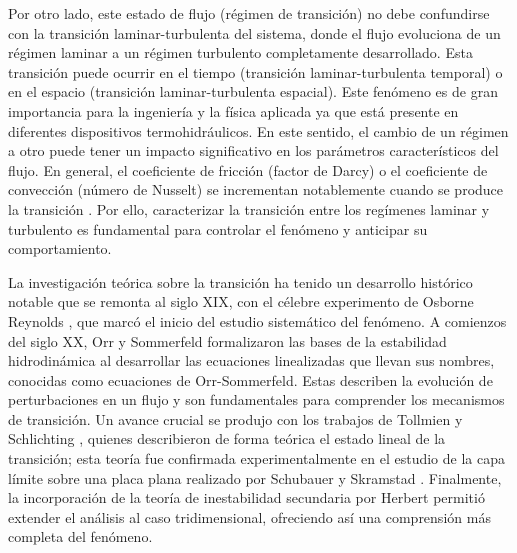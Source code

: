 Por otro lado, este estado de flujo (régimen de transición) no debe confundirse con la transición laminar-turbulenta del sistema, donde el flujo evoluciona de un régimen laminar a un régimen turbulento completamente desarrollado. Esta transición puede ocurrir en el tiempo (transición laminar-turbulenta temporal) o en el espacio (transición laminar-turbulenta espacial). Este fenómeno es de gran importancia para la ingeniería y la física aplicada ya que está presente en diferentes dispositivos termohidráulicos. En este sentido, el cambio de un régimen a otro puede tener un impacto significativo en los parámetros característicos del flujo. En general, el coeficiente de fricción (factor de Darcy) o el coeficiente de convección (número de Nusselt) se incrementan notablemente cuando se produce la transición \cite{incropera,white}. Por ello, caracterizar la transición entre los regímenes laminar y turbulento es fundamental para controlar el fenómeno y anticipar su comportamiento. 

La investigación teórica sobre la transición ha tenido un desarrollo histórico notable que se remonta al siglo XIX, con el célebre experimento de Osborne Reynolds \cite{reynolds1883}, que marcó el inicio del estudio sistemático del fenómeno. A comienzos del siglo XX, Orr \cite{orr1907} y Sommerfeld \cite{sommerfeld1908} formalizaron las bases de la estabilidad hidrodinámica al desarrollar las ecuaciones linealizadas que llevan sus nombres, conocidas como ecuaciones de Orr-Sommerfeld. Estas describen la evolución de perturbaciones en un flujo y son fundamentales para comprender los mecanismos de transición. Un avance crucial se produjo con los trabajos de Tollmien \cite{tollmien1930} y Schlichting \cite{schlichting1933}, quienes describieron de forma teórica el estado lineal de la transición; esta teoría fue confirmada experimentalmente en el estudio de la capa límite sobre una placa plana realizado por Schubauer y Skramstad \cite{schubauer1947laminar}. Finalmente, la incorporación de la teoría de inestabilidad secundaria por Herbert \cite{herbert1983secondary} permitió extender el análisis al caso tridimensional, ofreciendo así una comprensión más completa del fenómeno. 

